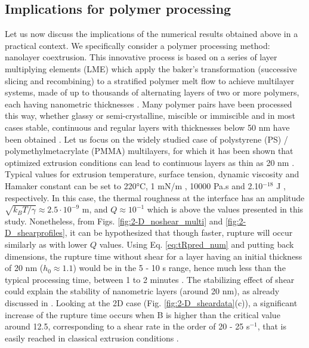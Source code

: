 \documentclass[
 onecolumn,
 amsmath,amssymb,
floatfix,superscriptaddress
]{revtex4-2}
\begin{document}
\subsection{Implications for polymer processing} 
\label{subsec:Discussion}

Let us now discuss the implications of the numerical results obtained above in a practical context. We specifically consider a polymer processing method: nanolayer coextrusion. This innovative process is based on a series of layer multiplying elements (LME) which apply the baker's transformation (successive slicing and recombining) to a stratified polymer melt flow to achieve multilayer systems, made of up to thousands of alternating layers of two or more polymers, each having nanometric thicknesses \cite{Gholami20}. Many polymer pairs have been processed this way, whether glassy or semi-crystalline, miscible or immiscible and in most cases stable, continuous and regular layers with thicknesses below 50 nm have been obtained \cite{Rijal22,Lozay21,Nassar18}. Let us focus on the widely studied case of polystyrene (PS) / polymethylmetacrylate (PMMA) multilayers, for which it has been shown that optimized extrusion conditions can lead to continuous layers as thin as 20 nm \cite{BironeauSollogoub2017}.  Typical values for extrusion temperature, surface tension, dynamic viscosity and Hamaker constant can be set to 220°C, 1 mN/m \cite{Wu70}, 10000 Pa.s \cite{BironeauSollogoub2017} and 2.10$^{-18}$ J \cite{deSilva12,Kadri2021}, respectively. In this case, the thermal roughness at the interface has an amplitude  $\sqrt{k_B T/\gamma}\approx 2.5\cdot 10^{-9}$ m, and $Q\approx 10^{-1}$ which is above the values presented in this study. Nonetheless, from Figs. \ref{fig:2-D_noshear_multi} and \ref{fig:2-D_shearprofiles}, it can be hypothesized that though faster, rupture will occur similarly as with lower $Q$ values. Using Eq. \eqref{eq:tRpred_num} and putting back dimensions, the rupture time without shear for a layer having an initial thickness of 20 nm ($h_0 \approx 1.1$) would be in the 5 - 10 s range, hence much less than the typical processing time, between 1 to 2 minutes \cite{Bironeau2016}. The stabilizing effect of shear could explain the stability of nanometric layers (around 20 nm), as already discussed in \cite{Kadri2021}. Looking at the 2D case (Fig. \ref{fig:2-D_sheardata}(c)), a significant increase of the rupture time occurs when B is higher than the critical value around 12.5, corresponding to a shear rate in the order of 20 - 25 s$^{-1}$, that is easily reached in classical extrusion conditions \cite{Bironeau2016}. 
\end{document}
